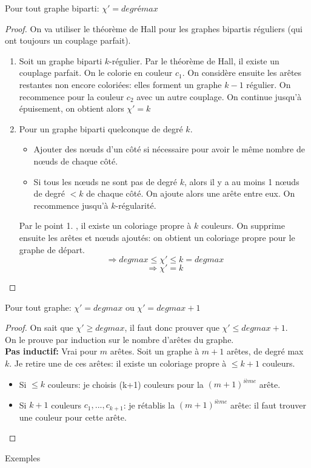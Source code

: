 \begin{mytheo}[König]
  Pour tout graphe biparti: $\chi '= degré max$
  \begin{proof}
    On va utiliser le théorème de Hall pour les graphes bipartis réguliers (qui ont toujours un couplage parfait).
    \begin{enumerate}
    
    
    \item Soit un graphe biparti $k$-régulier. Par le théorème de Hall, il existe un couplage parfait. On le colorie en couleur $c_{1}$. On considère ensuite les arêtes restantes non encore coloriées: elles forment un graphe $k-1$ régulier. On recommence pour la couleur $c_{2}$ avec un autre couplage. On continue jusqu'à épuisement, on obtient alors $\chi '=k$
    \item Pour un graphe biparti quelconque de degré $k$.
    \begin{itemize}
    \item Ajouter des nœuds d'un côté si nécessaire pour avoir le même nombre de nœuds de chaque côté.
    \item Si tous les nœuds ne sont pas de degré $k$, alors il y a au moins 1 nœuds de degré $<k$ de chaque côté. On ajoute alors une arête entre eux. On recommence jusqu'à $k$-régularité.
    \end{itemize}
    Par le point 1. , il existe un coloriage propre à $k$ couleurs. On supprime ensuite les arêtes et nœuds ajoutés: on obtient un coloriage propre pour le graphe de départ.
    $$\Rightarrow deg max \le \chi ' \le k=deg max$$
    $$\Rightarrow \chi ' = k$$
    \end{enumerate}
  \end{proof}
\end{mytheo}

\begin{mytheo} [Vizing]
Pour tout graphe: $\chi ' = deg max$ ou  $\chi ' = deg max + 1$
  \begin{proof} On sait que $\chi' \ge deg max$, il faut donc prouver que $\chi ' \le deg max + 1$.
  \\On le prouve par induction sur le nombre d'arêtes du graphe.
  \\ \textbf{Pas inductif:} Vrai pour $m$ arêtes. Soit un graphe à  $m+1$ arêtes, de degré max $k$. Je retire une de ces arêtes: il existe un coloriage propre à $\le k+1$ couleurs.
  \begin{itemize}
  \item Si $\le k$ couleurs: je choisis (k+1) couleurs pour la $(m+1)^{ième}$ arête.
  \item Si $k+1$ couleurs $c_{1},...,c_{k+1}$: je rétablis la $(m+1)^{ième}$ arête: il faut trouver une couleur pour cette arête.
  \end{itemize}

  \end{proof}
\end{mytheo}
\begin{myexem}
  Exemples
\end{myexem}